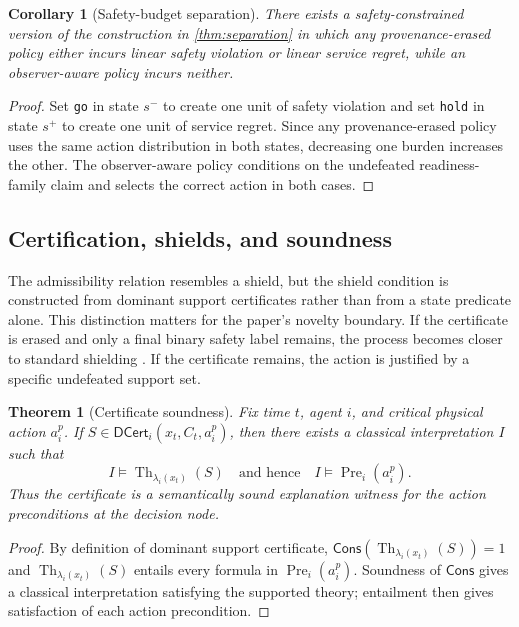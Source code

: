 \documentclass[11pt]{article}
\newcommand{\Cons}{\mathsf{Cons}}
\newcommand{\Th}{\operatorname{Th}}
\newcommand{\DCert}{\mathsf{DCert}}
\newcommand{\1}{\mathbf{1}}
\theoremstyle{definition}
\theoremstyle{plain}
\newtheorem{theorem}[definition]{Theorem}
\newtheorem{corollary}[definition]{Corollary}
\theoremstyle{remark}
\begin{document}
\begin{corollary}[Safety-budget separation]
\label{cor:safety}
There exists a safety-constrained version of the construction in \cref{thm:separation} in which any provenance-erased policy either incurs linear safety violation or linear service regret, while an observer-aware policy incurs neither.
\end{corollary}

\begin{proof}
Set \texttt{go} in state $s^-$ to create one unit of safety violation and set \texttt{hold} in state $s^+$ to create one unit of service regret. Since any provenance-erased policy uses the same action distribution in both states, decreasing one burden increases the other. The observer-aware policy conditions on the undefeated readiness-family claim and selects the correct action in both cases.
\end{proof}

\subsection{Certification, shields, and soundness}

The admissibility relation resembles a shield, but the shield condition is constructed from dominant support certificates rather than from a state predicate alone. This distinction matters for the paper's novelty boundary. If the certificate is erased and only a final binary safety label remains, the process becomes closer to standard shielding \citep{Alshiekh2018,Carr2023ShieldingPOMDP}. If the certificate remains, the action is justified by a specific undefeated support set.

\begin{theorem}[Certificate soundness]
\label{thm:soundness}
Fix time $t$, agent $i$, and critical physical action $a_i^p$. If $S\in\DCert_i(x_t,C_t,a_i^p)$, then there exists a classical interpretation $I$ such that
\[
I\models\Th_{\lambda_i(x_t)}(S)
\quad\text{and hence}\quad
I\models\operatorname{Pre}_i(a_i^p).
\]
Thus the certificate is a semantically sound explanation witness for the action preconditions at the decision node.
\end{theorem}

\begin{proof}
By definition of dominant support certificate, $\Cons(\Th_{\lambda_i(x_t)}(S))=1$ and $\Th_{\lambda_i(x_t)}(S)$ entails every formula in $\operatorname{Pre}_i(a_i^p)$. Soundness of $\Cons$ gives a classical interpretation satisfying the supported theory; entailment then gives satisfaction of each action precondition.
\end{proof}
\end{document}
